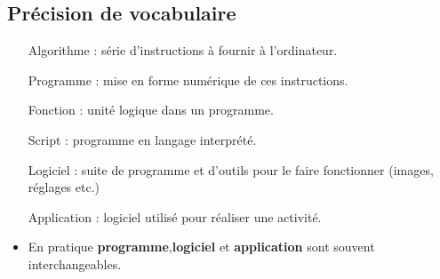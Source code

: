 \subsection{Précision de vocabulaire}
\begin{slide}
	\begin{itemize}
		\item[Algorithme] : série d'instructions à fournir à l'ordinateur.
		\item[Programme] : mise en forme numérique de ces instructions. 
		\item[Fonction] : unité logique dans un programme.
		\item[Script] : programme en langage interprété.
		\item[Logiciel] : suite de programme et d'outils pour le faire fonctionner (images, réglages etc.)
		\item[Application] : logiciel utilisé pour réaliser une activité.
		\item En pratique \textbf{programme},\textbf{logiciel} et \textbf{application} sont souvent interchangeables.
	\end{itemize}
\end{slide}